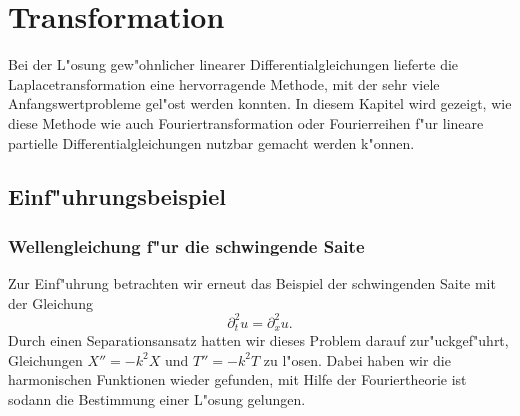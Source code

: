 %
%
%
\chapter{Transformation}
Bei der L"osung gew"ohnlicher linearer Differentialgleichungen lieferte die
Laplacetransformation eine hervorragende Methode, mit der sehr
viele Anfangswertprobleme gel"ost werden konnten.
In diesem Kapitel wird gezeigt, wie diese Methode wie auch
Fouriertransformation oder Fourierreihen 
f"ur lineare partielle Differentialgleichungen nutzbar gemacht
werden k"onnen.

\section{Einf"uhrungsbeispiel}
\subsection{Wellengleichung f"ur die schwingende Saite}
Zur Einf"uhrung betrachten wir erneut das Beispiel der
schwingenden Saite mit der Gleichung
\[
\partial_t^2u=\partial_x^2u.
\]
Durch einen Separationsansatz hatten wir dieses Problem
darauf zur"uckgef"uhrt, Gleichungen $X''=-k^2X$ und $T''=-k^2T$
zu l"osen.
Dabei haben wir die harmonischen Funktionen wieder gefunden,
mit Hilfe der Fouriertheorie ist sodann die Bestimmung einer L"osung
gelungen.


